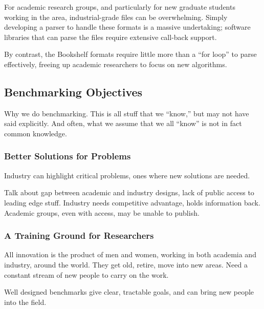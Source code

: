 \documentclass[sigconf]{acmart}
\begin{document}
For academic research groups, and particularly for new graduate
students working in the area, industrial-grade files can
be overwhelming.  Simply developing a parser to handle these
formats is a massive undertaking; software libraries that can
parse the files require extensive call-back support.

By contrast, the Bookshelf formats require little more than
a ``for loop'' to parse effectively, freeing up academic researchers
to focus on new algorithms.  





\subsection{Benchmarking Objectives}

Why we do benchmarking.  This is all stuff that we ``know,'' but
may not have said explicitly.  And often, what we assume that we
all ``know'' is not in fact common knowledge.


\subsubsection{Better Solutions for Problems}

Industry can highlight critical problems, ones where new solutions
are needed.

Talk about gap between academic and industry designs, lack of
public access to leading edge stuff.  Industry needs competitive
advantage, holds information back.  Academic groups, even
with access, may be unable to publish.


\subsubsection{A Training Ground for Researchers}

All innovation is the product of men and women, working in both
academia and industry, around the world.  They get old, retire,
move into new areas.  Need a constant stream of new people to
carry on the work.

Well designed benchmarks give clear, tractable goals, and can
bring new people into the field.
\end{document}
